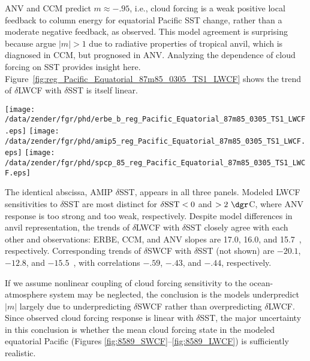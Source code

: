 \documentclass[agums]{aguplus}
\begin{document}
ANV and CCM predict $m \approx -.95$, i.e., cloud forcing is a weak
positive local feedback to column energy for equatorial Pacific SST
change, rather than a moderate negative feedback, as observed.
This model agreement is surprising because \cite{RaC91} argue
$|m| > 1$ due to radiative properties of tropical anvil, which is
diagnosed in CCM, but prognosed in ANV.
Analyzing the dependence of cloud forcing on SST provides insight
here.
Figure~\ref{fig:reg_Pacific_Equatorial_87m85_0305_TS1_LWCF} shows the
trend of $\delta$LWCF with $\delta$SST is itself linear.
\begin{figure*}
\begin{center}
\texttt{[image: /data/zender/fgr/phd/erbe\_b\_reg\_Pacific\_Equatorial\_87m85\_0305\_TS1\_LWCF.eps]}%
\texttt{[image: /data/zender/fgr/phd/amip5\_reg\_Pacific\_Equatorial\_87m85\_0305\_TS1\_LWCF.eps]}%
\texttt{[image: /data/zender/fgr/phd/spcp\_85\_reg\_Pacific\_Equatorial\_87m85\_0305\_TS1\_LWCF.eps]}%
\end{center}
\caption[Same as Figure~\ref{fig:reg_Pacific_Equatorial_87m85_0305_LWCF_SWCF}
but for SST and LWCF]{
Same as Figure~\ref{fig:reg_Pacific_Equatorial_87m85_0305_LWCF_SWCF}
but for SST (\dgr K) and LWCF.
\label{fig:reg_Pacific_Equatorial_87m85_0305_TS1_LWCF}}   
\end{figure*}
The identical abscissa, AMIP $\delta$SST, appears in all three panels.
Modeled LWCF sensitivities to $\delta$SST are most distinct for
$\delta \mbox{\textrm{SST}} < 0$ and $> 2\ \dgr$C, where ANV response is too
strong and too weak, respectively.
Despite model differences in anvil representation, the trends of
$\delta$LWCF with $\delta$SST closely agree with each other and
observations: ERBE, CCM, and ANV slopes are 17.0, 16.0, and
15.7~\wxmSk, respectively.   
Corresponding trends of $\delta$SWCF with $\delta$SST (not shown)
are $-20.1$, $-12.8$, and $-15.5$~\wxmSk, with correlations  $-.59$,
$-.43$, and $-.44$, respectively. 

If we assume nonlinear coupling of cloud forcing sensitivity to the
ocean-atmosphere system may be neglected, the conclusion is the models
underpredict $|m|$ largely due to underpredicting $\delta$SWCF rather
than overpredicting $\delta$LWCF. 
Since observed cloud forcing response is linear with $\delta$SST, the
major uncertainty in this conclusion is whether the mean cloud forcing 
state in the modeled equatorial Pacific (Figures
\ref{fig:8589_SWCF}--\ref{fig:8589_LWCF}) is sufficiently realistic. 
\end{document}
